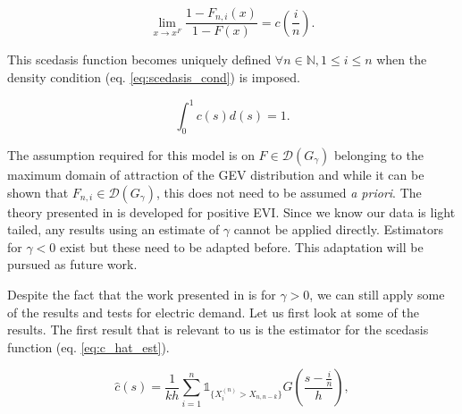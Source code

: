 \begin{equation} \label{eq:scedasisfn}
\lim_{x \rightarrow x^F} \frac{1-F_{n,i}(x)}{1 - F(x)} = c\left(\frac{i}{n}\right).
\end{equation}

\noindent This scedasis function becomes uniquely defined  $\forall n \in \mathbb{N}, 1 \le i \le n$ when the density condition (eq. \ref{eq:scedasis_cond}) is imposed.


\begin{equation} \label{eq:scedasis_cond}
\int_0^1 c(s)d(s) = 1.
\end{equation}

The assumption required for this model is on $F  \in \mathcal{D}(G_{\gamma})$ belonging to the maximum domain of attraction of the GEV distribution and while it can be shown that $F_{n,i}  \in \mathcal{D}(G_{\gamma})$, this does not need to be assumed \textit{a priori}. The theory presented in \cite{einmahl16} is developed for positive EVI. Since we know our data is light tailed, any results using an estimate of $\gamma$ cannot be applied directly. Estimators for $\gamma <0$ exist \citep{Ferreira17} but these need to be adapted before. This adaptation will be pursued as future work. %
%

Despite the fact that the work presented in \cite{einmahl16} is for $\gamma >0$, we can still apply some of the results and tests for electric demand. Let us first look at some of the results. %
The first result that is relevant to us is the estimator for the scedasis function (eq. \ref{eq:c_hat_est}).

\begin{equation} \label{eq:c_hat_est}
\hat{c}(s) = \frac{1}{kh} \sum_{i=1}^n \mathbb{1}_{\{X_i^{(n)} > X_{n,n-k}\}}G \left(\frac{s-\frac{i}{n}}{h} \right),
\end{equation}

